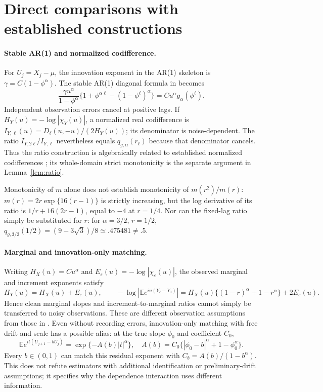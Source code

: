 \documentclass[11pt,a4paper]{article}
\theoremstyle{remark}\newtheorem{remark}[theorem]{Remark}
\newcommand{\E}{\mathbb E}\newcommand{\Pp}{\mathbb P}
\begin{document}
\appendix
{}
\section{Direct comparisons with established constructions}\label{app:comparison}
\paragraph{Stable AR(1) and normalized codifference.}
For $U_j=X_j-\mu$, the innovation exponent in the AR(1) skeleton is
$\gamma=C(1-\phi^\alpha)$. The stable AR(1) diagonal formula in \cite{nw} becomes
\[
\frac{\gamma u^\alpha}{1-\phi^\alpha}\{1+\phi^{\alpha\ell}-(1-\phi^\ell)^\alpha\}
=Cu^\alpha g_\alpha(\phi^\ell).
\]
Independent observation errors cancel at positive lags. If $H_Y(u)=-\log|\chi_Y(u)|$, a normalized real codifference is
$I_{Y,\ell}(u)=D_\ell(u,-u)/(2H_Y(u))$; its denominator is noise-dependent. The ratio $I_{Y,2\ell}/I_{Y,\ell}$ nevertheless equals $q_{g,\alpha}(r_\ell)$ because that denominator cancels. Thus the ratio construction is algebraically related to established normalized codifferences \cite{rd}; its whole-domain strict monotonicity is the separate argument in Lemma~\ref{lem:ratio}.

Monotonicity of $m$ alone does not establish monotonicity of $m(r^2)/m(r)$: $m(r)=2r\exp\{16(r-1)\}$ is strictly increasing, but the log derivative of its ratio is $1/r+16(2r-1)$, equal to $-4$ at $r=1/4$. Nor can the fixed-lag ratio simply be substituted for $r$: for $\alpha=3/2$, $r=1/2$,
$q_{g,3/2}(1/2)=(9-3\sqrt3)/8\simeq.475481\ne.5$.

\paragraph{Marginal and innovation-only matching.}
Writing $H_X(u)=Cu^\alpha$ and $E_\varepsilon(u)=-\log|\chi_\varepsilon(u)|$, the observed marginal and increment exponents satisfy
\[
H_Y(u)=H_X(u)+E_\varepsilon(u),\qquad
-\log|\E e^{iu(Y_\ell-Y_0)}|
=H_X(u)\{(1-r)^\alpha+1-r^\alpha\}+2E_\varepsilon(u).
\]
Hence clean marginal slopes and increment-to-marginal ratios cannot simply be transferred to noisy observations. These are different observation assumptions from those in \cite{tl,chl}.
Even without recording errors, innovation-only matching with free drift and scale has a possible alias: at the true slope $\phi_0$ and coefficient $C_0$,
\[
\E e^{it(U_{j+1}-bU_j)}=\exp\{-A(b)|t|^\alpha\},\quad
A(b)=C_0\{|\phi_0-b|^\alpha+1-\phi_0^\alpha\}.
\]
Every $b\in(0,1)$ can match this residual exponent with $C_b=A(b)/(1-b^\alpha)$. This does not refute estimators with additional identification or preliminary-drift assumptions; it specifies why the dependence interaction uses different information.
\end{document}
